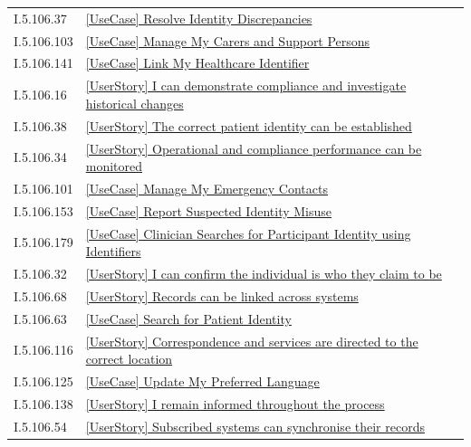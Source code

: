 \begin{longtable}{p{.22\linewidth}p{.73\linewidth}}
I.5.106.37 & \hyperref[element:baf61f6b8ecd45ab94b2b5c596cf5333]{[UseCase] Resolve Identity Discrepancies} \\
I.5.106.103 & \hyperref[element:bca03f046fd0477594010f7e82395d5a]{[UseCase] Manage My Carers and Support Persons} \\
I.5.106.141 & \hyperref[element:be897b23da0b43409ef102a66e126f83]{[UseCase] Link My Healthcare Identifier} \\
I.5.106.16 & \hyperref[element:bfc6e1bbdb814aa6be80e868b1870447]{[UserStory] I can demonstrate compliance and investigate historical changes} \\
I.5.106.38 & \hyperref[element:c352207709f54e22bbaaca1fda5b4f52]{[UserStory] The correct patient identity can be established} \\
I.5.106.34 & \hyperref[element:c7f19646f4644390a2ce35df7cbe3252]{[UserStory] Operational and compliance performance can be monitored} \\
I.5.106.101 & \hyperref[element:c8870a64585844eaa104e5ea1eac2aea]{[UseCase] Manage My Emergency Contacts} \\
I.5.106.153 & \hyperref[element:c8af53b8d67d42fca361032ad0ba6e82]{[UseCase] Report Suspected Identity Misuse} \\
I.5.106.179 & \hyperref[element:c946c3c10ab14ba58160e574764c108a]{[UseCase] Clinician Searches for Participant Identity using Identifiers} \\
I.5.106.32 & \hyperref[element:c9c427102f9b4828ad9b210a5b229b32]{[UserStory] I can confirm the individual is who they claim to be} \\
I.5.106.68 & \hyperref[element:ca11db4a095f4bdc8f7bfcf10dcfb6b6]{[UserStory] Records can be linked across systems} \\
I.5.106.63 & \hyperref[element:cb053864073846a6ba06667f69b9ab58]{[UseCase] Search for Patient Identity} \\
I.5.106.116 & \hyperref[element:cbbf86ece6054f9ab28878cea2c5e3b9]{[UserStory] Correspondence and services are directed to the correct location} \\
I.5.106.125 & \hyperref[element:cc27feaf23aa4b95960d2837a0946c0a]{[UseCase] Update My Preferred Language} \\
I.5.106.138 & \hyperref[element:cd4212e6f91b498ab8f110cb56f448ac]{[UserStory] I remain informed throughout the process} \\
I.5.106.54 & \hyperref[element:ce7d2132da214c7bab8297d4ebde2e78]{[UserStory] Subscribed systems can synchronise their records} \\

\end{longtable}
